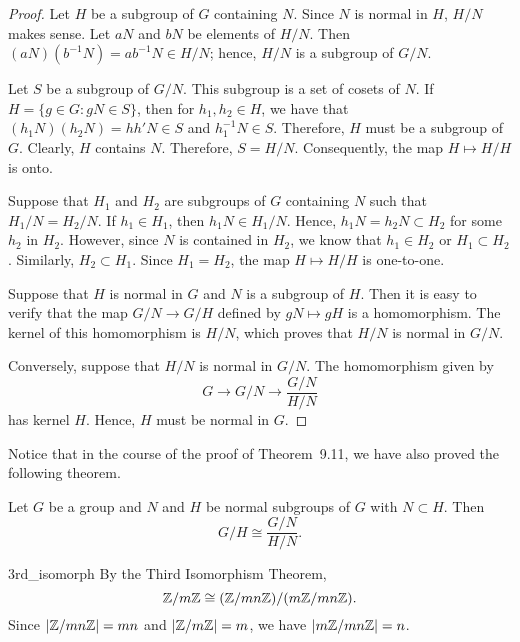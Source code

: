  
\begin{proof}
Let $H$ be a subgroup of $G$ containing $N$. Since $N$ is normal in
$H$, $H/N$ makes sense.  Let $aN$ and $bN$ be elements of $H/N$. Then
$(aN)( b^{-1} N )= ab^{-1}N \in H/N$; hence, $H/N$ is a subgroup of
$G/N$. 


Let $S$ be a subgroup of $G/N$. This subgroup is a set of cosets of
$N$.  If  $H= \{ g \in G : gN \in S \}$, then for $h_1, h_2 \in H$, we
have that $(h_1 N)( h_2 N )= h h' N \in S$ and $h_1^{-1} N \in S$.
Therefore, $H$ must be a subgroup of $G$. Clearly, $H$ contains $N$.
Therefore, $S = H / N$. Consequently, the map  $H \mapsto H/H$ is
onto. 

 
Suppose that $H_1$ and $H_2$ are subgroups of $G$ containing $N$ such
that $H_1/N = H_2/N$. If $h_1 \in H_1$, then $h_1 N \in H_1/N$. Hence,
$h_1 N = h_2 N \subset H_2$ for some $h_2$ in $H_2$. However, since
$N$ is contained in $H_2$, we know that $h_1 \in H_2$ or $H_1 \subset
H_2$. Similarly, $H_2 \subset H_1$.  Since $H_1 = H_2$, the map  $H
\mapsto H/H$ is one-to-one. 

 
Suppose that $H$ is normal in $G$ and $N$ is a subgroup of $H$.  Then
it is easy to verify that the map $G/N \rightarrow G/H$ defined by $gN
\mapsto gH$ is  a homomorphism.  The kernel of this homomorphism is
$H/N$, which proves that $H/N$ is normal in $G/N$. 
 
 
Conversely, suppose that $H/N$ is normal in $G/N$. The homomorphism
given by 
$$
G \rightarrow G/N \rightarrow \frac{G/N}{H/N}
$$
has kernel $H$. Hence, $H$ must be normal in $G$.
\end{proof}
 
\medskip
 
 
Notice that in the course of the proof of Theorem~9.11, we have also
proved the following theorem. 
 
 
\begin{theorem}
Let $G$ be a group and $N$ and $H$ be normal subgroups of $G$ with $N
\subset H$.  Then 
$$
G/H \cong \frac{G/N}{H/N}.
$$
\end{theorem}
 
 
\begin{example}{3rd_isomorph}
By the Third Isomorphism Theorem,
$$
{\Bbb Z} / m {\Bbb Z} \cong ({\Bbb Z}/ mn {\Bbb Z})/ (m {\Bbb Z}/ mn
{\Bbb Z}). 
$$
Since $| {\Bbb Z} / mn {\Bbb Z} | = mn$ and  $|{\Bbb Z} / m{\Bbb Z}| =
m$, we have $| m {\Bbb Z} / mn {\Bbb Z}| = n$. 
\end{example}
 
